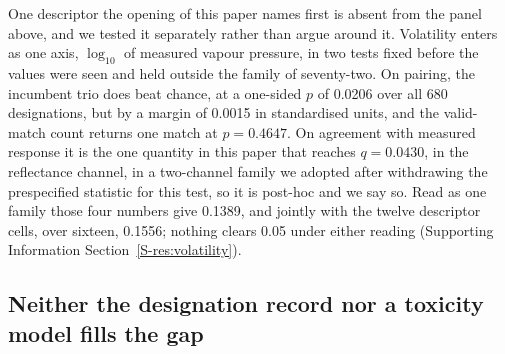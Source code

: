 \documentclass[journal=jacsat,manuscript=article,margin=1in]{achemso}
\begin{document}
One descriptor the opening of this paper names first is absent from the panel
above, and we tested it separately rather than argue around it. Volatility
enters as one axis, $\log_{10}$ of measured vapour pressure, in two tests fixed
before the values were seen and held outside the family of seventy-two. On
pairing, the incumbent trio does beat chance, at a one-sided $p$ of 0.0206 over
all 680 designations, but by a margin of 0.0015 in standardised units, and the
valid-match count returns one match at $p = 0.4647$. On agreement with measured
response it is the one quantity in this paper that reaches $q = 0.0430$, in the
reflectance channel, in a two-channel family we adopted after withdrawing the
prespecified statistic for this test, so it is post-hoc and we say so. Read as
one family those four numbers give 0.1389, and jointly with the twelve
descriptor cells, over sixteen, 0.1556; nothing clears 0.05 under either
reading (Supporting Information Section~\ref{S-res:volatility}).

\subsection{Neither the designation record nor a toxicity model fills the gap}
\label{res:docs}
\end{document}
